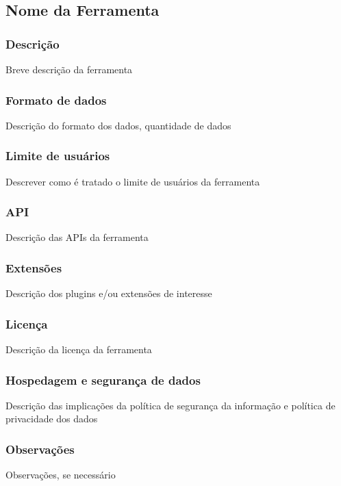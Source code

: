 \documentclass[a4paper, 12pt]{article}
\begin{document}
\subsection{Nome da Ferramenta}

\subsubsection{Descrição}
Breve descrição da ferramenta

\subsubsection{Formato de dados}
Descrição do formato dos dados, quantidade de dados

\subsubsection{Limite de usuários}
Descrever como é tratado o limite de usuários da ferramenta

\subsubsection{API}
Descrição das APIs da ferramenta

\subsubsection{Extensões}
Descrição dos plugins e/ou extensões de interesse

\subsubsection{Licença}
Descrição da licença da ferramenta

\subsubsection{Hospedagem e segurança de dados}
Descrição das implicações da política de segurança da informação e política de privacidade dos dados

\subsubsection{Observações}
Observações, se necessário

\clearpage
\end{document}
